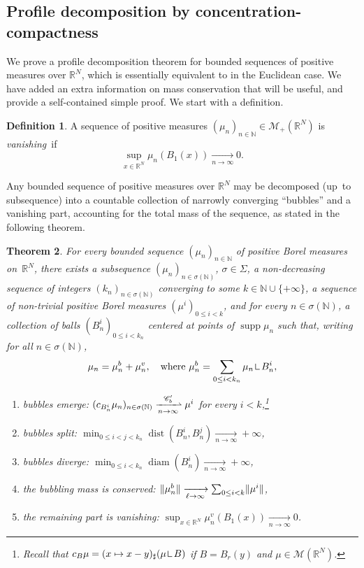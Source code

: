 \documentclass[JEP,XML,SOM,Unicode,published]{cedram}
\theoremstyle{plain}
\newtheorem{theorem}{Theorem}[section]
\theoremstyle{definition}
\newtheorem{definition}[theorem]{Definition}
\newcommand{\N}{\mathbb{N}}
\newcommand{\R}{\mathbb{R}}
\newcommand{\Cspace}{\mathscr{C}}
\newcommand{\Mspace}{\mathscr{M}}
\newcommand{\mres}{\mathop{\hbox{\vrule height 6pt width .5pt depth 0pt \vrule height .5pt width 4pt depth 0pt}}\nolimits}
\DeclarePairedDelimiter{\norm}{\lVert}{\rVert}
\DeclareMathOperator{\supp}{supp}
\DeclareMathOperator{\diam}{diam}
\DeclareMathOperator{\dist}{dist}
\newcommand{\xto}[2][]{\xrightarrow[#2]{#1}}
\newcommand{\xnarrowto}[1]{\xrightharpoonup[#1]{\Cspace_b'}}
\begin{document}
\subsection{Profile decomposition by concentration-compactness}

We prove a profile decomposition theorem for bounded sequences of positive measures over $\R^N$, which is essentially equivalent to \cite[Th.\,1.5]{marisProfileDecompositionSequences2014} in the Euclidean case. We have added an extra information on mass conservation that will be useful, and provide a self-contained simple proof. We start with a definition.

\begin{definition}\label{DefinitionVanishing}
A sequence of positive measures $(\mu_n)_{n\in\N} \!\in\! \Mspace_+(\R^N)$ is \emph{vanishing}~if
\[\sup_{x\in \R^N} \mu_n(B_1(x)) \xto{n\to \infty} 0.\]
\end{definition}

Any bounded sequence of positive measures over $\R^N$ may be decomposed (up~to subsequence) into a countable collection of narrowly converging \enquote{bubbles} and a vanishing part, accounting for the total mass of the sequence, as stated in the following theorem.

\begin{theorem}\label{profileDecomposition}
For every bounded sequence \((\mu_n)_{n\in\N}\) of positive Borel measures on~\(\R^N\), there exists a subsequence \((\mu_n)_{n \in \sigma(\N)}\), $\sigma \in \Sigma$, a non-decreasing sequence of integers $(k_n)_{n \in \sigma(\N)}$ converging to some $k \in \N \cup \{+\infty\}$, a sequence of non-trivial positive Borel measures $(\mu^i)_{0\le i<k}$, and for every $n \in \sigma(\N)$, a collection of balls $(B^i_n)_{0 \leq i < k_n}$ centered at points of $\supp \mu_n$ such that, writing for all $n\in \sigma(\N)$,
\begin{equation}
\mu_n = \mu^b_n + \mu^v_n,\quad \text{where } \mu^b_n = \sum_{0\le i < k_n} \mu_n \mres B_n^i,
\end{equation}
\vspace*{-5pt}
\begin{enumerate}[\textnormal(\textup{\Alph*}\textnormal),leftmargin=1.3\normalparindent]
\item\label{bubbleEmergence} bubbles emerge: $(c_{B_{n}^i} \mu_{n})_{n\in\sigma(\N)}\xnarrowto{n\to\infty}\mu^i$ for every $i<k$,\footnote{Recall that $c_B \mu = (x\mapsto x-y)_\sharp(\mu \mres B)$ if $B = B_r(y)$ and $\mu \in \Mspace(\R^N)$.}
\item\label{bubbleSplitting} bubbles split: $\min_{0\le i<j< k_{n}}\dist(B_{n}^i,B_{n}^j) \xto{n\to\infty} +\infty$,
\item\label{bubbleDivergence} bubbles diverge: $ \min_{0\le i< k_n}\diam(B_{n}^i) \xto{n\to\infty} +\infty$,
\item\label{bubblingMassConservation} the bubbling mass is conserved: $\norm{\mu^b_{n}} \xto{\ell \to \infty} \sum_{0\le i<k} \norm{\mu^i}$,
\item\label{remainingVanishing} the remaining part is vanishing: $\sup_{x\in \R^N} \mu^v_{n}(B_1(x)) \xto{n\to\infty} 0$.
\end{enumerate}
\end{theorem}
\end{document}
